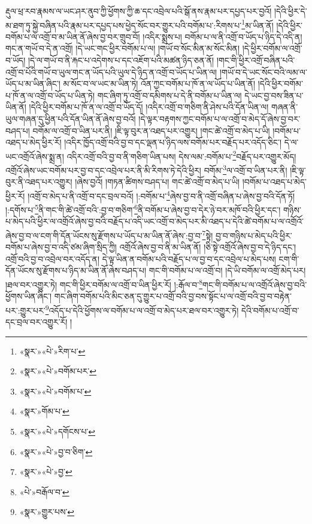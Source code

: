 རྡུལ་ཕྲ་རབ་རྣམས་ལ་ཡང་ཤར་ནུབ་ཀྱི་ཕྱོགས་ཀྱི་ཆ་དང་འབྲེལ་པའི་སྒོ་ནས་རྣམ་པར་དཔྱད་པར་བྱའོ། །དེའི་ཕྱིར་དེ་མ་ཐག་ཏུ་སྐྱེ་བཞིན་པའི་རྣམ་པར་དཔྱད་པས་ཕྱེད་སོང་བར་གྱུར་པའི་བགོམ་པ་:རིགས་པ་\footnote{«སྣར་»«པེ་»རིག་པ་}མ་ཡིན་ནོ། །དེའི་ཕྱིར་བགོམ་པ་ལ་འགྲོ་བ་མ་ཡིན་ནོ་ཞེས་བྱ་བར་གྲུབ་བོ། །འདིར་སྨྲས་པ། བགོམ་པ་ལ་ནི་འགྲོ་བ་ཡོད་པ་ཉིད་དེ་འདི་ན། གང་ན་གཡོ་བ་དེ་ན་འགྲོ། །དེ་ཡང་གང་ཕྱིར་བགོམ་པ་ལ། །གཡོ་བ་སོང་མིན་མ་སོང་མིན། །དེ་ཕྱིར་བགོམ་ལ་འགྲོ་བ་ཡོད། །དེ་ལ་གཡོ་བ་ནི་རྐང་པ་འདེགས་པ་དང་འཇོག་པའི་མཚན་ཉིད་ཅན་ནོ། །གང་གི་ཕྱིར་འགྲོ་བཞིན་པའི་འགྲོ་བ་པོའི་གཡོ་བ་ཡུལ་གང་ན་ཡོད་པའི་ཡུལ་དེ་ཉིད་ན་འགྲོ་བ་ཡོད་པ་ཡིན་ལ། །གཡོ་བ་དེ་ཡང་སོང་བའི་ལམ་ལ་ཡོད་པ་མ་ཡིན་ཞིང་། མ་སོང་བ་ལ་ཡང་མ་ཡིན་ཏེ། འོན་ཀྱང་བགོམ་པ་ཁོ་ན་ལ་ཡོད་པ་ཡིན་ནོ། །དེའི་ཕྱིར་བགོམ་པ་ཁོ་ན་ལ་འགྲོ་བ་ཡོད་པ་ཡིན་ཏེ། གང་ཞིག་ཏུ་འགྲོ་བ་དམིགས་པ་དེ་ནི་བགོམ་པ་ཡིན་ལ། དེ་ཡང་བྱ་བས་ཟིན་པ་ཡིན་ནོ། །དེའི་ཕྱིར་བགོམ་པ་ཁོ་ན་ལ་འགྲོ་བ་ཡོད་དོ། །འདིར་འགྲོ་བ་གཅིག་ནི་ཤེས་པའི་དོན་ཡིན་ལ། གཞན་ནི་ཡུལ་གཞན་དུ་ཕྱིན་པའི་དོན་ཡིན་ནོ་ཞེས་བྱ་བའོ། །དེ་ལྟར་བརྟགས་ཀྱང་བགོམ་པ་ལ་འགྲོ་བ་མེད་དོ་ཞེས་བྱ་བར་བཤད་པ། བགོམ་ལ་འགྲོ་བ་ཡིན་པར་ནི། །ཇི་ལྟ་བུར་ན་འཐད་པར་འགྱུར། །གང་ཚེ་འགྲོ་བ་མེད་པ་ཡི། །བགོམ་པ་འཐད་པ་མེད་ཕྱིར་རོ། །འདིར་ཁྱོད་འགྲོ་བའི་བྱ་བ་དང་ལྡན་པ་ཉིད་ལས་བགོམ་པར་བརྗོད་པར་འདོད་ཅིང་། དེ་ལ་ཡང་འགྲོའོ་ཞེས་སྨྲ་ན། འདིར་འགྲོ་བའི་བྱ་བ་ནི་གཅིག་ཡིན་པས། དེས་ལམ་:བགོམ་པ་\footnote{«སྣར་»«པེ་»བགོམ་པར་}བརྗོད་པར་འགྱུར་མོད། འགྲོའོ་ཞེས་ཡང་བགོམ་པར་བྱ་བ་དང་འབྲེལ་པར་ནི་མི་རིགས་ཏེ་དེའི་ཕྱིར། བགོམ་\footnote{«སྣར་»«པེ་»བགོམ་པ་}ལ་འགྲོ་བ་ཡིན་པར་ནི། །ཇི་ལྟ་བུར་ནི་འཐད་པར་འགྱུར། །ཞེས་བྱའོ། །གཏན་ཚིགས་བཤད་པ། གང་ཚེ་འགྲོ་བ་མེད་པ་ཡི། །བགོམ་པ་འཐད་པ་མེད་ཕྱིར་རོ། །འགྲོ་བ་མེད་པ་ནི་འགྲོ་བ་དང་བྲལ་བའོ། །:བགོམ་པ་\footnote{«སྣར་»གོམ་པ་}ཞེས་བྱ་བ་ནི་འགྲོ་བཞིན་པ་ཞེས་བྱ་བའི་དོན་ཏོ། །:དགོས་པ་\footnote{«སྣར་»«པེ་»དགོངས་པ་}ནི་གང་གི་ཚེ་འགྲོ་བའི་:བྱ་བ་གཅིག་\footnote{«སྣར་»«པེ་»བྱ་བ་ཅིག་}ནི་བགོམ་པ་ཞེས་བྱ་བ་དེར་ཉེ་བར་མཁོ་བའི་ཕྱིར་དང་། གཉིས་པ་མེད་པའི་ཕྱིར་ལ་འགྲོའོ་ཞེས་བྱ་བའི་བརྗོད་པ་འདི་ཡང་འགྲོ་བ་མེད་པར་མི་འཐད་པ་དེའི་ཚེ་བགོམ་པ་ལ་འགྲོའོ་ཞེས་བྱ་བ་ལ་ངག་གི་དོན་ཡོངས་སུ་རྫོགས་པ་ཡོད་པ་མ་ཡིན་ནོ་ཞེས་:བྱ་བ་\footnote{«སྣར་»«པེ་»བྱ་}སྟེ། བྱ་བ་གཉིས་པ་མེད་པའི་ཕྱིར་བགོམ་པ་ཞེས་བྱ་བ་འདི་ཙམ་ཞིག་སྲིད་ཀྱི། འགྲོའོ་ཞེས་བྱ་བ་ནི་མ་ཡིན་ནོ། །ཅི་སྟེ་འགྲོའོ་ཞེས་བྱ་བ་དེ་ཉིད་དང་། འགྲོ་བའི་བྱ་བ་འབྲེལ་བར་འདོད་ན། དེ་ལྟ་ཡིན་ན་བགོམ་པའི་བརྗོད་པ་ལ་བྱ་བ་དང་འབྲེལ་པ་མེད་པས། ངག་གི་དོན་ཡོངས་སུ་རྫོགས་པ་ཉིད་མ་ཡིན་ནོ་ཞེས་བཤད་པ། གང་གི་བགོམ་པ་ལ་འགྲོ་བ། །དེ་ཡི་བགོམ་ལ་འགྲོ་མེད་པར། །ཐལ་བར་འགྱུར་ཏེ། གང་གི་ཕྱིར་བགོམ་ལ་འགྲོ་བ་ཡིན་ཕྱིར་རོ། །:རྒོལ་བ་\footnote{«པེ་»བརྒོལ་བ་}གང་གི་བགོམ་པ་ལ་འགྲོའོ་ཞེས་བྱ་བའི་ཕྱོགས་ཡིན་ཞིང་། གང་ཞིག་བགོམ་པའི་མིང་ཅན་དུ་གྱུར་པ་འགྲོ་བའི་བྱ་བས་སྟོང་པ་ལ་འགྲོ་བའི་བྱ་བ་བརྟེན་པར་:གྱུར་པར་\footnote{«སྣར་»གྱུར་པས་}འདོད་པ་དེའི་ཕྱོགས་ལ་བགོམ་པ་ལ་འགྲོ་བ་མེད་པར་ཐལ་བར་འགྱུར་ཏེ། དེའི་བགོམ་པ་འགྲོ་བ་དང་བྲལ་བར་འགྱུར་རོ། །

